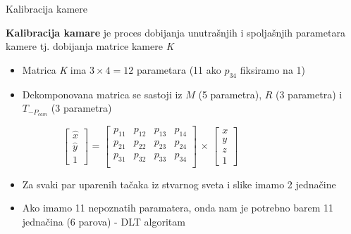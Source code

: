 \documentclass[bookmarks=true,bookmarksopen=true,pdfborder={0 0 0},pdfhighlight={/N},linkbordercolor={.5 .5 .5},implicit=false,unicode,xcolor={table}]{beamer}
\begin{document}
\begin{frame}{Kalibracija kamere}

  \textbf{Kalibracija kamare} je proces dobijanja unutrašnjih i spoljašnjih parametara kamere tj. dobijanja matrice kamere \textit{K}
  \begin{itemize}
    \item Matrica \textit{K} ima $3 \times 4 = 12$ parametara (11 ako $p_{34}$ fiksiramo na 1)
    \item Dekomponovana matrica se sastoji iz $M$ (5 parametra), $R$ (3 parametra) i $T_{-P_{cam}}$ (3 parametra)
  \end{itemize}
  \begin{figure}
    \begin{subfigure}{7cm}
      $\begin{bmatrix}
        \hat{x}\\
        \hat{y}\\
        1
      \end{bmatrix}$
      =
      $\begin{bmatrix}
        p_{11} & p_{12} & p_{13} & p_{14}\\
        p_{21} & p_{22} & p_{23} & p_{24}\\
        p_{31} & p_{32} & p_{33} & p_{34}\\
      \end{bmatrix}$
      $\times$
      $\begin{bmatrix}
        x\\
        y\\
        z\\
        1
      \end{bmatrix}$
    \end{subfigure}
  \end{figure}
  \begin{itemize}
    \item Za svaki par uparenih tačaka iz stvarnog sveta i slike imamo 2 jednačine
    \item Ako imamo 11 nepoznatih paramatera, onda nam je potrebno barem 11 jednačina (6 parova) - DLT algoritam
  \end{itemize}

\end{frame}
\end{document}
